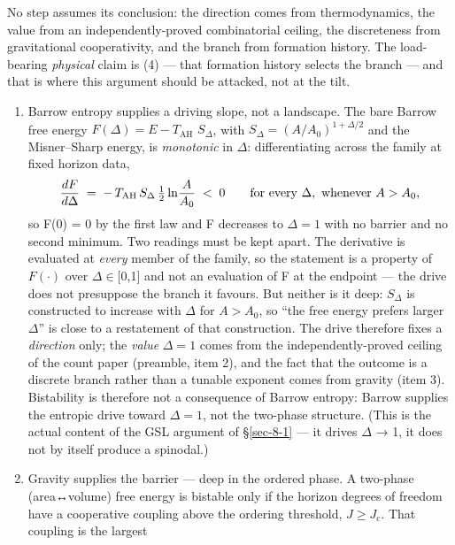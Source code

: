 \documentclass[aps,prd,preprint,nofootinbib,superscriptaddress]{revtex4-2}
\begin{document}
No step assumes its conclusion: the direction comes from thermodynamics,
the value from an independently-proved combinatorial ceiling, the
discreteness from gravitational cooperativity, and the branch from
formation history. The load-bearing \emph{physical} claim is (4) ---
that formation history selects the branch --- and that is where this
argument should be attacked, not at the tilt.

\begin{enumerate}
\def\labelenumi{(\roman{enumi})}
\item
  Barrow entropy supplies a driving slope, not a landscape. The bare
  Barrow free energy \(F(\Delta ) = E - T_\mathrm{AH}\) \(S_\Delta\),
  with \(S_\Delta  = (A/A_{0})^{1+\Delta /2}\) and the Misner--Sharp
  energy, is \emph{monotonic} in \(\Delta\): differentiating across the
  family at fixed horizon data,
  \begin{equation}\frac{dF}{d\Delta} \;=\; -\,T_{\rm AH}\,S_\Delta\,\tfrac{1}{2}\ln\!\frac{A}{A_0} \;<\; 0
  \qquad\text{for every }\Delta,\ \text{whenever } A > A_0,\end{equation} so F(0) =
  0 by the first law and F decreases to \(\Delta  = 1\) with no barrier
  and no second minimum. Two readings must be kept apart. The derivative
  is evaluated at \emph{every} member of the family, so the statement is
  a property of \(F(\cdot )\) over \(\Delta  \in  [0\),1{]} and not an
  evaluation of F at the endpoint --- the drive does not presuppose the
  branch it favours. But neither is it deep: \(S_\Delta\) is constructed
  to increase with \(\Delta\) for \(A > A_{0}\), so ``the free energy
  prefers larger \(\Delta\)'' is close to a restatement of that
  construction. The drive therefore fixes a \emph{direction} only; the
  \emph{value} \(\Delta  = 1\) comes from the independently-proved
  ceiling of the count paper (preamble, item 2), and the fact that the
  outcome is a discrete branch rather than a tunable exponent comes from
  gravity (item 3). Bistability is therefore not a consequence of Barrow
  entropy: Barrow supplies the entropic drive toward \(\Delta  = 1\),
  not the two-phase structure. (This is the actual content of the GSL
  argument of §\ref{sec-8-1} --- it drives \(\Delta\) → 1, it does not
  by itself produce a spinodal.)
\item
  Gravity supplies the barrier --- deep in the ordered phase. A
  two-phase (area↔volume) free energy is bistable only if the horizon
  degrees of freedom have a cooperative coupling above the ordering
  threshold, \(J \geq  J_{\mathrm{c}}\). That coupling is the largest

\end{enumerate}
\end{document}
